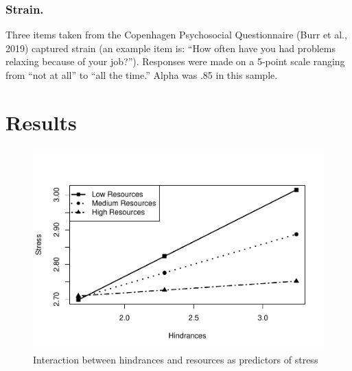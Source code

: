 \documentclass[
  english,
  man]{apa6}
\begin{document}
\hypertarget{strain.}{%
\subsubsection{Strain.}\label{strain.}}

Three items taken from the Copenhagen Psychosocial Questionnaire (Burr et al., 2019) captured strain (an example item is: ``How often have you had problems relaxing because of your job?''). Responses were made on a 5-point scale ranging from ``not at all'' to ``all the time.'' Alpha was .85 in this sample.

\hypertarget{results}{%
\section{Results}\label{results}}

\begin{figure}
\centering
\includegraphics{SIOP_PROCESS_files/figure-latex/analyses-1.pdf}
\caption{\label{fig:analyses}Interaction between hindrances and resources as predictors of stress}
\end{figure}
\end{document}
